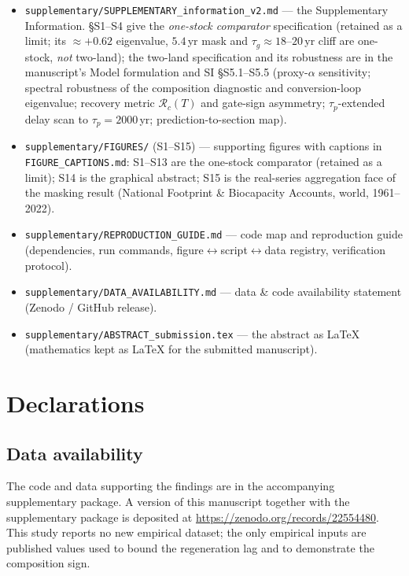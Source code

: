 \documentclass[11pt]{article}
\begin{document}
\begin{itemize}
\item \texttt{supplementary/SUPPLEMENTARY\_information\_v2.md} --- the Supplementary Information. \S S1--S4 give the \emph{one-stock comparator} specification (retained as a limit; its $\approx+0.62$ eigenvalue, $5.4$\,yr mask and $\tau_g\approx18$--$20$\,yr cliff are one-stock, \emph{not} two-land); the two-land specification and its robustness are in the manuscript's Model formulation and SI \S S5.1--S5.5 (proxy-$\alpha$ sensitivity; spectral robustness of the composition diagnostic and conversion-loop eigenvalue; recovery metric $\mathcal{R}_c(T)$ and gate-sign asymmetry; $\tau_p$-extended delay scan to $\tau_p=2000$\,yr; prediction-to-section map).
\item \texttt{supplementary/FIGURES/} (S1--S15) --- supporting figures with captions in \texttt{FIGURE\_CAPTIONS.md}: S1--S13 are the one-stock comparator (retained as a limit); S14 is the graphical abstract; S15 is the real-series aggregation face of the masking result (National Footprint \& Biocapacity Accounts, world, 1961--2022).
\item \texttt{supplementary/REPRODUCTION\_GUIDE.md} --- code map and reproduction guide (dependencies, run commands, figure$\leftrightarrow$script$\leftrightarrow$data registry, verification protocol).
\item \texttt{supplementary/DATA\_AVAILABILITY.md} --- data \& code availability statement (Zenodo / GitHub release).
\item \texttt{supplementary/ABSTRACT\_submission.tex} --- the abstract as LaTeX (mathematics kept as LaTeX for the submitted manuscript).
\end{itemize}

\section*{Declarations}

\subsection*{Data availability}
The code and data supporting the findings are in the accompanying supplementary package. A version of this manuscript together with the supplementary package is deposited at \url{https://zenodo.org/records/22554480}. This study reports no new empirical dataset; the only empirical inputs are published values used to bound the regeneration lag and to demonstrate the composition sign.
\end{document}
